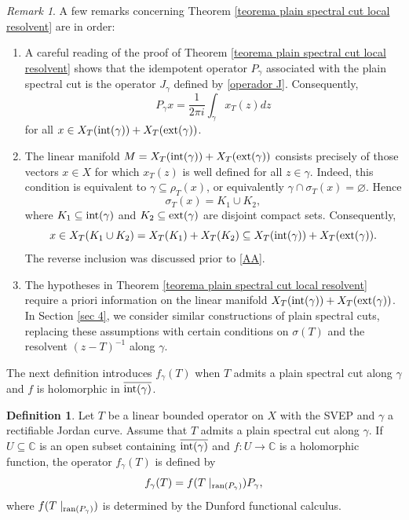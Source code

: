 \documentclass[11pt]{amsart}
\theoremstyle{definition}
\newtheorem{definition}[theorem]{Definition}
\theoremstyle{remark}
\newtheorem{remark}[theorem]{Remark}
\numberwithin{equation}{section}
\newcommand{\ran}{\textnormal{ran}}
\newcommand{\C}{\mathbb{C}}
\newcommand{\inte}{\textnormal{int}}
\newcommand{\exte}{\textnormal{ext}}
\begin{document}
\begin{remark}A few remarks concerning Theorem \ref{teorema plain spectral cut local resolvent} are in order:
\begin{enumerate}
\item [(i)] A careful reading of the proof of Theorem \ref{teorema plain spectral cut local resolvent} shows that the idempotent operator $P_\gamma$ associated with the plain spectral cut is the operator $J_\gamma$ defined by \ref{operador J}. Consequently,
        $$
        P_\gamma x = \frac{1}{2\pi i}\int_\gamma x_T(z)dz
        $$
        for all $x\in X_T(\inte(\gamma))+X_T(\exte(\gamma))$.

\item [(ii)]The linear manifold $M = X_T(\inte(\gamma)) + X_T(\exte(\gamma))$ consists precisely of those vectors $x \in X$ for which $x_T(z)$ is well defined for all $z \in \gamma$. Indeed, this condition is equivalent to $\gamma \subseteq \rho_T(x)$, or equivalently $\gamma \cap \sigma_T(x)=\varnothing$. Hence
$$
\sigma_T(x) = K_1 \cup K_2,
$$
where $K_1 \subseteq \inte(\gamma)$ and $K_2 \subseteq \exte(\gamma)$ are disjoint compact sets. Consequently,
$$
x \in X_T(K_1 \cup K_2) = X_T(K_1)+X_T(K_2)
\subseteq X_T(\inte(\gamma))+X_T(\exte(\gamma)).
$$
The reverse inclusion was discussed prior to \eqref{AA}.

\item [(iii)] The hypotheses in Theorem \ref{teorema plain spectral cut local resolvent} require a priori information on the linear manifold $X_T(\inte(\gamma)) + X_T(\exte(\gamma))$. In Section \ref{sec 4}, we consider similar constructions of plain spectral cuts, replacing these assumptions with certain conditions on $\sigma(T)$ and the resolvent $(z-T)^{-1}$ along $\gamma$.
    \end{enumerate}
\end{remark}

\noindent The next definition introduces $f_\gamma(T)$  when $T$ admits a plain spectral cut along $\gamma$ and $f$ is holomorphic in $\overline{\inte(\gamma)}$.

\smallskip
	
\begin{definition}\label{definicion unconventional functional calculus}
		Let $T$ be a linear bounded operator on $X$ with the SVEP and $\gamma$ a rectifiable Jordan curve. Assume that $T$ admits a plain spectral cut along $\gamma$. If $U\subseteq  \C$ is an open subset containing $\overline{\inte(\gamma)}$ and $f: U \rightarrow \C$ is a holomorphic function, the operator $f_\gamma(T)$ is defined by
		\begin{equation}\label{expresion f_Gamma}
			f_\gamma(T) = f(T\mid_{\ran (P_\gamma)})P_\gamma,
		\end{equation}
		where $f(T\mid_{\ran (P_\gamma)})$ is determined by the Dunford functional calculus.
	\end{definition}
\end{document}
